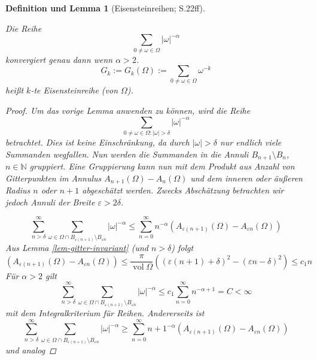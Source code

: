 \documentclass[12pt]{article}
\newtheorem{deflemma}[theorem]{Definition und Lemma}
\numberwithin{equation}{section}
\newcommand{\kk}{\cite{kk} }
\newcommand{\vol}{\operatorname{vol}}
\begin{document}
\begin{deflemma}[Eisensteinreihen; \kk S.22ff]\label{thm-eisen}

Die Reihe \begin{equation}{
\sum_{0 \ne \omega  \in \Omega} |\omega|^{-\alpha}
}\end{equation} konvergiert genau dann wenn \(\alpha > 2\).
\begin{equation}{
G_k := G_k(\Omega) := \sum_{0 \ne \omega  \in \Omega} \omega^{-k}
}\end{equation} heißt \(k\)-te Eisensteinreihe (von \(\Omega\)).

\begin{proof}

Um das vorige Lemma anwenden zu können, wird die Reihe \begin{equation}{
\sum_{0 \ne \omega \in \Omega : |\omega| > \delta}  |\omega|^{-\alpha}
}\end{equation} betrachtet. Dies ist keine Einschränkung, da durch
\(|\omega| > \delta\) nur endlich viele Summanden wegfallen. Nun werden
die Summanden in die Annuli \(B_{n+1} \setminus B_n\),
\(n \in \mathbb N\) gruppiert. Eine Gruppierung kann nun mit dem Produkt
aus Anzahl von Gitterpunkten im Annulus
\(A_{n+1}(\Omega) - A_n(\Omega)\) und dem inneren oder äußeren Radius
\(n\) oder \(n+1\) abgeschätzt werden. Zwecks Abschätzung betrachten wir
jedoch Annuli der Breite \(\varepsilon > 2\delta\).

\newcommand{\sumoverannuli}{\sum_{\omega \in \Omega \cap B_{\varepsilon (n+1)} \setminus B_{\varepsilon n}}}
\newcommand{\annulicount}{ \left( A_{\varepsilon (n+1)}(\Omega) - A_{\varepsilon n}(\Omega) \right) }

\begin{equation}{
\sum_{n>\delta }^\infty \sumoverannuli  |\omega|^{-\alpha} \le \sum_{n=0}^\infty n^{-\alpha } \annulicount
}\end{equation} Aus Lemma \ref{lem-gitter-invariant} (und
\(n > \delta\)) folgt \begin{equation}{
\annulicount \le \frac{\pi }{\vol \Omega} \left(  (\varepsilon (n+1) + \delta )^2 - (\varepsilon n - \delta )^2  \right) \le c_1 n
}\end{equation} Für \(\alpha > 2\) gilt \begin{equation}{
\sum_{n>\delta }^\infty  \sumoverannuli   |\omega|^{-\alpha} \le c_1 \sum_{n=0}^\infty n^{-\alpha +1} = C < \infty
}\end{equation} mit dem Integralkriterium für Reihen. Andererseits ist
\begin{equation}{
\sum_{n>\delta }^\infty  \sumoverannuli   |\omega|^{-\alpha} \ge \sum_{n=0}^\infty {n+1}^{-\alpha }  \annulicount
}\end{equation} und analog


\end{proof}
\end{deflemma}
\end{document}
